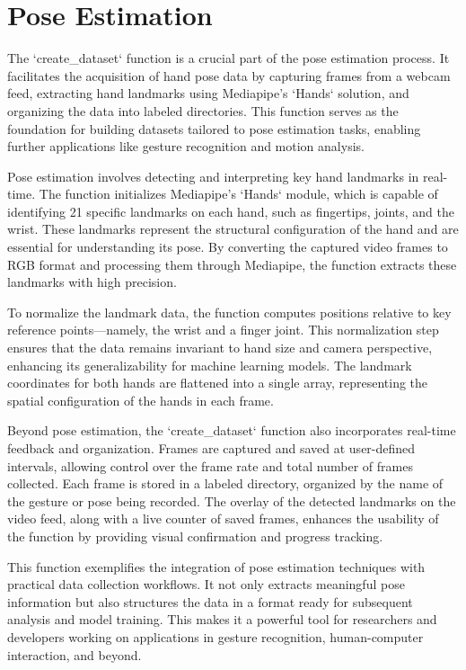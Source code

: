 \section{Pose Estimation}

The `create\_dataset` function is a crucial part of the pose estimation process. It facilitates the acquisition of hand pose data by capturing frames from a webcam feed, extracting hand landmarks using Mediapipe's `Hands` solution, and organizing the data into labeled directories. This function serves as the foundation for building datasets tailored to pose estimation tasks, enabling further applications like gesture recognition and motion analysis.

Pose estimation involves detecting and interpreting key hand landmarks in real-time. The function initializes Mediapipe's `Hands` module, which is capable of identifying 21 specific landmarks on each hand, such as fingertips, joints, and the wrist. These landmarks represent the structural configuration of the hand and are essential for understanding its pose. By converting the captured video frames to RGB format and processing them through Mediapipe, the function extracts these landmarks with high precision.

To normalize the landmark data, the function computes positions relative to key reference points—namely, the wrist and a finger joint. This normalization step ensures that the data remains invariant to hand size and camera perspective, enhancing its generalizability for machine learning models. The landmark coordinates for both hands are flattened into a single array, representing the spatial configuration of the hands in each frame.

Beyond pose estimation, the `create\_dataset` function also incorporates real-time feedback and organization. Frames are captured and saved at user-defined intervals, allowing control over the frame rate and total number of frames collected. Each frame is stored in a labeled directory, organized by the name of the gesture or pose being recorded. The overlay of the detected landmarks on the video feed, along with a live counter of saved frames, enhances the usability of the function by providing visual confirmation and progress tracking.

This function exemplifies the integration of pose estimation techniques with practical data collection workflows. It not only extracts meaningful pose information but also structures the data in a format ready for subsequent analysis and model training. This makes it a powerful tool for researchers and developers working on applications in gesture recognition, human-computer interaction, and beyond.

